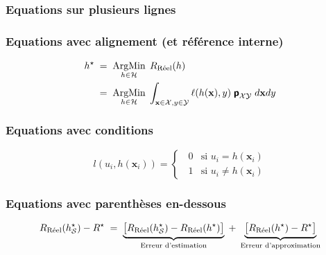 \documentclass[a4paper, french]{article}
\newcommand{\prob}{\textbf{\textsf{\textup{p}}}}  %
\begin{document}

\subsubsection{Equations sur plusieurs lignes}

\subsubsection{Equations avec alignement (et référence interne)}

\begin{equation}
\label{eq-h-reelle-optimale}
\begin{split}
h^{\star} \; &= \; \operatornamewithlimits{ArgMin}_{h \in \cal{H}}\; R_{\text{Réel}}(h) \\
&= \;
\operatornamewithlimits{ArgMin}_{h \in \cal{H}}\; \int_{\mathbf{x} \in {\cal X}, y \in {\cal Y}} \ell(h(\mathbf{x}), y) \; \prob_{{\cal X}{\cal Y}} \; d\mathbf{x} dy
\end{split}
\end{equation}

\subsubsection{Equations avec conditions}

\begin{equation}
l(u_{i},h({\mathbf x}_{i})) =
\begin{cases}
\;\; 0 & \text{si $u_{i} = h({\mathbf x}_{i})$}  \\
\;\; 1 & \text{si $u_{i} \neq h({\mathbf x}_{i})$}
\end{cases}
\end{equation}


\subsubsection{Equations avec parenthèses en-dessous}

\begin{equation}
R_{\text{Réel}}(h^{\star}_{\cal S}) - R^{\star} \; = \; \underbrace{\bigl[R_{\text{Réel}}(h^{\star}_{\cal S}) - R_{\text{Réel}}(h^{\star}) \bigr]}_{\text{Erreur d'estimation}} \; + \; \underbrace{\bigl[R_{\text{Réel}}(h^{\star}) - R^{\star} \bigr]}_{\text{Erreur d'approximation}}
\end{equation}
\end{document}
